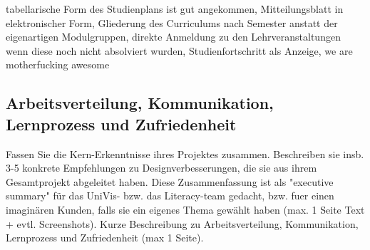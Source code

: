 \documentclass[a4paper,10pt]{scrartcl}
\begin{document}
tabellarische Form des Studienplans ist gut angekommen, Mitteilungsblatt in elektronischer Form, Gliederung des Curriculums nach Semester anstatt der eigenartigen
Modulgruppen, direkte Anmeldung zu den Lehrveranstaltungen wenn diese noch nicht absolviert wurden, Studienfortschritt als Anzeige, we are motherfucking awesome

\subsection{Arbeitsverteilung, Kommunikation, Lernprozess und Zufriedenheit}


    Fassen Sie die Kern-Erkenntnisse ihres Projektes zusammen. Beschreiben sie insb. 3-5 konkrete Empfehlungen zu Designverbesserungen, 
    die sie aus ihrem Gesamtprojekt abgeleitet haben. Diese Zusammenfassung ist als "executive summary" für das UniVis- bzw. das Literacy-team gedacht, 
    bzw. fuer einen imaginären Kunden, falls sie ein eigenes Thema gewählt haben (max. 1 Seite Text + evtl. Screenshots).
    Kurze Beschreibung zu Arbeitsverteilung, Kommunikation, Lernprozess und Zufriedenheit (max 1 Seite). 
\end{document}
